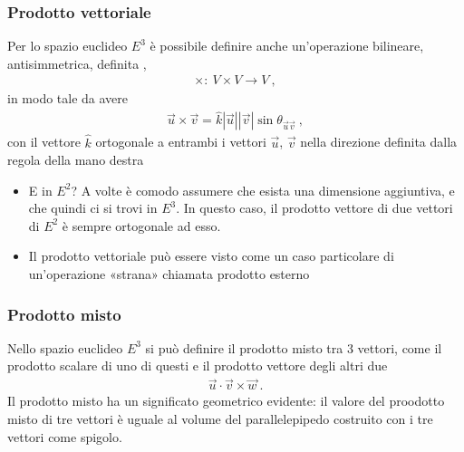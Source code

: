 \documentclass[letterpaper,10pt,italian]{jupyterBook}
\begin{document}
\subsubsection{Prodotto vettoriale}
\label{\detokenize{ch/algebra/vector-algebra-euclidean-space-3d:prodotto-vettoriale}}\label{\detokenize{ch/algebra/vector-algebra-euclidean-space-3d:math-hs-algebra-vector-euclidean-space-3d-vector-product}}
\sphinxAtStartPar
Per lo spazio euclideo \(E^3\) è possibile definire anche un’operazione bilineare, antisimmetrica, definita ,
\begin{equation*}
\begin{split}\times: \ V \times V \rightarrow V \ ,\end{split}
\end{equation*}
\sphinxAtStartPar
in modo tale da avere
\begin{equation*}
\begin{split}\vec{u} \times \vec{v} = \hat{k} |\vec{u}| |\vec{v}| \sin \theta_{\vec{u} \vec{v}} \ ,\end{split}
\end{equation*}
\sphinxAtStartPar
con il vettore \(\hat{k}\) ortogonale a entrambi i vettori \(\vec{u}\), \(\vec{v}\) nella direzione definita dalla regola della mano destra 
\begin{itemize}
\item {} 
\sphinxAtStartPar
{} E in \(E^2\)? A volte è comodo assumere che esista una dimensione aggiuntiva, e che quindi ci si trovi in \(E^3\). In questo caso, il prodotto vettore di due vettori di \(E^2\) è sempre ortogonale ad esso.

\item {} 
\sphinxAtStartPar
{} Il prodotto vettoriale può essere visto come un caso particolare di un’operazione «strana» chiamata prodotto esterno

\end{itemize}


\subsubsection{Prodotto misto}
\label{\detokenize{ch/algebra/vector-algebra-euclidean-space-3d:prodotto-misto}}\label{\detokenize{ch/algebra/vector-algebra-euclidean-space-3d:math-hs-algebra-vector-euclidean-space-3d-mixed-product}}
\sphinxAtStartPar
Nello spazio euclideo \(E^3\) si può definire il prodotto misto tra 3 vettori, come il prodotto scalare di uno di questi e il prodotto vettore degli altri due
\begin{equation*}
\begin{split}\vec{u} \cdot \vec{v} \times \vec{w} \ .\end{split}
\end{equation*}
\sphinxAtStartPar
Il prodotto misto ha un significato geometrico evidente: il valore del proodotto misto di tre vettori è uguale al volume del parallelepipedo costruito con i tre vettori come spigolo.
\end{document}
